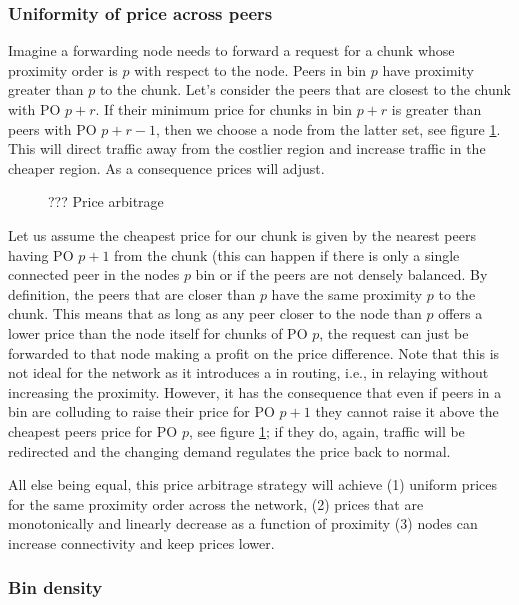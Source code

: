 \subsubsection{Uniformity of price across peers}

Imagine a forwarding node needs to forward a request for a chunk whose proximity order is $p$ with respect to the node. 
Peers in bin $p$ have proximity greater than $p$ to the chunk. Let's consider the peers that are closest to the chunk with PO $p+r$. If their minimum price for chunks in bin $p+r$ is greater than peers with PO $p+r-1$, then we choose a node from the latter set, see figure  \ref{fig:price-arbitrage}. This will direct traffic away from the costlier region and increase traffic in the cheaper region. As a consequence prices will adjust. 

\begin{figure}[htbp]
   \centering
   \caption[??? Price arbitrage]{??? Price arbitrage}
   \label{fig:price-arbitrage}
\end{figure}

Let us assume the cheapest price for our chunk is given by the nearest peers having PO $p+1$ from the chunk (this can happen if there is only a single connected peer in the nodes $p$ bin or if the peers are not densely balanced. By definition, the peers that are closer than $p$ have the same proximity $p$ to the chunk. This means that as long as any peer closer to the node than $p$ offers a lower price than the node itself for chunks of PO $p$, the request can just be forwarded to that node making a profit on the price difference. Note that this is not ideal for the network as it introduces a  in routing, i.e., in relaying without increasing the proximity. However, it has the consequence that even if peers in a bin are colluding to raise their price for PO $p+1$ they cannot raise it above the cheapest peers price for PO $p$, see figure  \ref{fig:price-arbitrage}; if they do, again, traffic will be redirected and the changing demand regulates the price back to normal. 

All else being equal, this price arbitrage strategy will achieve (1) uniform prices for the same proximity order across the network, (2) prices that are monotonically and  linearly decrease as a function of proximity (3) nodes can increase connectivity and keep prices lower.


\subsubsection{Bin density}

